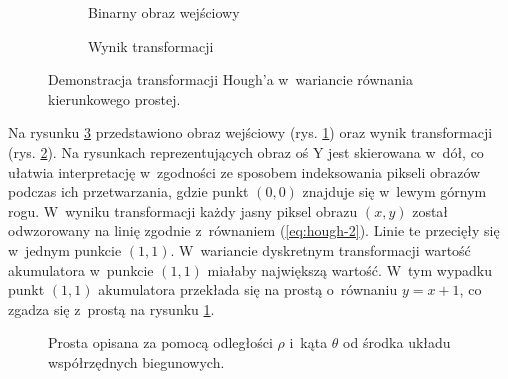 \begin{figure}
    \centering
    \begin{subfigure}{0.45\textwidth}
        \centering
        
    \caption{Binarny obraz wejściowy}\label{fig:houghSlopeA}
    \end{subfigure}\hfill
    \begin{subfigure}{0.45\textwidth}
        \centering
        
    \caption{Wynik transformacji}\label{fig:houghSlopeB}
    \end{subfigure}

    \caption{Demonstracja transformacji Hough'a w~wariancie równania kierunkowego prostej.}
    \label{fig:houghSlope}

\end{figure}
\hspace{1cm}


Na rysunku \ref{fig:houghSlope} przedstawiono obraz wejściowy (rys. \ref{fig:houghSlopeA}) oraz wynik transformacji (rys. \ref{fig:houghSlopeB}). Na rysunkach reprezentujących obraz oś Y jest skierowana w~dół, co ułatwia interpretację w~zgodności ze sposobem indeksowania pikseli obrazów podczas ich przetwarzania, gdzie punkt $(0,0)$ znajduje się w~lewym górnym rogu. W~wyniku transformacji każdy jasny piksel obrazu $(x, y)$ został odwzorowany na linię zgodnie z~równaniem (\ref{eq:hough-2}). Linie te przecięły się w~jednym punkcie $(1,1)$. W~wariancie dyskretnym transformacji wartość akumulatora w~punkcie $(1,1)$ miałaby największą wartość. W~tym wypadku punkt $(1,1)$ akumulatora przekłada się na prostą o~równaniu $y = x+1$, co zgadza się z~prostą na rysunku \ref{fig:houghSlopeA}.
\begin{wrapfigure}{r}{7cm}
    \centering
    
    \caption{Prosta opisana za pomocą odległości $\rho$ i~kąta $\theta$ od środka układu współrzędnych biegunowych.}
    \label{fig:houghLineAngle}
\end{wrapfigure}




